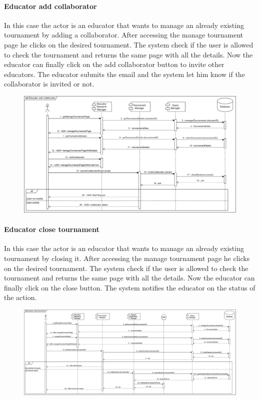 \documentclass[12pt, a4paper]{report}
\begin{document}
    \paragraph*{Educator add collaborator}
    In this case the actor is an educator that wants to manage an already existing tournament by adding a collaborator. 
    After accessing the manage tournament page he clicks on the desired tournament. 
    The system check if the user is allowed to check the tournament and returns the same page with all the details. 
    Now the educator can finally click on the add collaborator button to invite other educators. 
    The educator submits the email and the system let him know if the collaborator is invited or not. 
    \begin{figure}[H]
        \centering
        \includegraphics[width=1.0\linewidth]{images/eacrv.png}
    \end{figure}

    \paragraph*{Educator close tournament}
    In this case the actor is an educator that wants to manage an already existing tournament by closing it. 
    After accessing the manage tournament page he clicks on the desired tournament. 
    The system check if the user is allowed to check the tournament and returns the same page with all the details. 
    Now the educator can finally click on the close button. 
    The system notifies the educator on the status of the action. 
    \begin{figure}[H]
        \centering
        \includegraphics[width=1.0\linewidth]{images/ectrv1.png}
    \end{figure}
\end{document}
